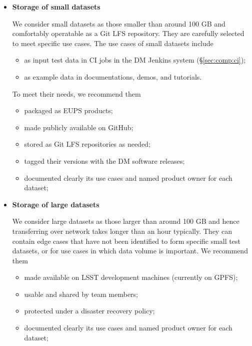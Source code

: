 \begin{itemize}
  \item \textbf{Storage of small datasets}

  We consider small datasets as those smaller than around 100 GB
  and comfortably operatable as a Git LFS repository. They are
  carefully selected to meet specific use cases. The use cases of
  small datasets include

  \begin{itemize}
    \item{as input test data in CI jobs in the DM Jenkins system
          (\S\ref{sec:comp:ci});}
    \item{as example data in documentations, demos, and tutorials.}
  \end{itemize}

  To meet their needs, we recommend them

  \begin{itemize}
    \item{packaged as EUPS products;}
    \item{made publicly available on GitHub;}
    \item{stored as Git LFS repositories as needed;}
    \item{tagged their versions with the DM software releases;}
    \item{documented clearly its use cases and named product owner for each dataset;}
  \end{itemize}

  \item \textbf{Storage of large datasets}

  We consider large datasets as those larger than around 100 GB and
  hence transferring over network takes longer than an hour typically.
  They can contain edge cases that have not been identified to form
  specific small test datasets, or for use cases in which data
  volume is important.  We recommend them

  \begin{itemize}
    \item{made available on LSST development machines (currently on GPFS);}
    \item{usable and shared by team members;}
    \item{protected under a disaster recovery policy;}
    \item{documented clearly its use cases and named product owner for each dataset;}
  \end{itemize}

\end{itemize}

